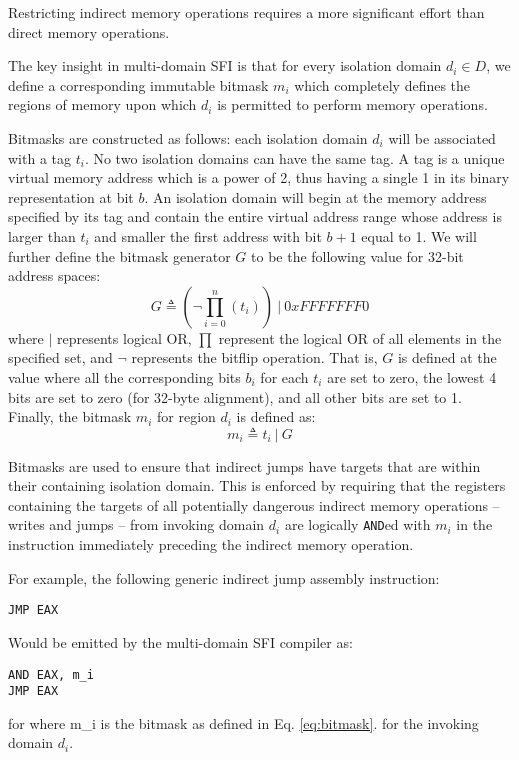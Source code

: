 \documentclass[12pt]{IEEEtran}
\begin{document}
Restricting indirect memory operations requires a more significant effort than direct memory operations.

The key insight in multi-domain SFI is that for every isolation domain $d_i \in D$, we define a corresponding immutable bitmask $m_i$ which completely defines the regions of memory upon which $d_i$ is permitted to perform memory operations.

Bitmasks are constructed as follows: each isolation domain $d_i$ will be associated with a tag $t_i$. No two isolation domains can have the same tag. A tag is a unique virtual memory address which is a power of 2, thus having a single 1 in its binary representation at bit $b$.  An isolation domain will begin at the memory address specified by its tag and contain the entire virtual address range whose address is larger than $t_i$ and smaller the first address with bit $b+1$ equal to 1. We will further define the bitmask generator $G$ to be the following value for 32-bit address spaces:
\begin{equation} \label{eq:G}
G \triangleq (\neg\prod_{i=0}^n(t_i))\ |\  0xFFFFFFF0
\end{equation}
where $|$ represents logical OR, $\prod$ represent the logical OR of all elements in the specified set, and $\neg$ represents the bitflip operation. That is, $G$ is defined at the value where all the corresponding bits $b_i$ for each $t_i$ are set to zero, the lowest 4 bits are set to zero (for 32-byte alignment), and all other bits are set to 1. Finally, the bitmask $m_i$  for region $d_i$ is defined as:
\begin{equation} \label{eq:bitmask}
m_i \triangleq t_i\ |\ G
\end{equation}

Bitmasks are used to ensure that indirect jumps have targets that are within their containing isolation domain. This is enforced by requiring that the registers containing the targets of all potentially dangerous indirect memory operations -- writes and jumps -- from invoking domain $d_i$ are logically \texttt{AND}ed with $m_i$ in the instruction immediately preceding the indirect memory operation.

For example, the following generic indirect jump assembly instruction:
\begin{verbatim}
JMP EAX
\end{verbatim}
Would be emitted by the multi-domain SFI compiler as:
\begin{verbatim}
AND EAX, m_i
JMP EAX
\end{verbatim}
for where m\_i is the bitmask as defined in Eq. \ref{eq:bitmask}.  for the invoking domain $d_i$. \\
\end{document}
